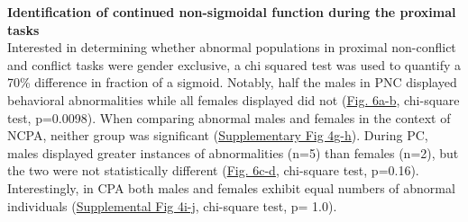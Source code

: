 \documentclass{article}
\begin{document}
\vspace{1em}

\noindent\textbf{Identification of continued non-sigmoidal function during the proximal tasks}\\
Interested in determining whether abnormal populations in proximal non-conflict and conflict tasks were gender exclusive, a chi squared test was used to quantify a 70\% difference in fraction of a sigmoid. Notably, half the males in PNC displayed behavioral abnormalities while all females displayed did not (\hyperref[fig:alcohol_main_6]{Fig. 6a-b}, chi-square test, p=0.0098). When comparing abnormal males and females in the context of NCPA, neither group was significant (\hyperref[fig:Alcohol_SI_4]{Supplementary Fig 4g-h}). During PC, males displayed greater instances of abnormalities (n=5) than females (n=2), but the two were not statistically different (\hyperref[fig:alcohol_main_6]{Fig. 6c-d}, chi-square test, p=0.16). Interestingly, in CPA both males and females exhibit equal numbers of abnormal individuals (\hyperref[fig:Alcohol_SI_4]{Supplemental Fig 4i-j}, chi-square test, p= 1.0).

\vspace{1em}
\end{document}
